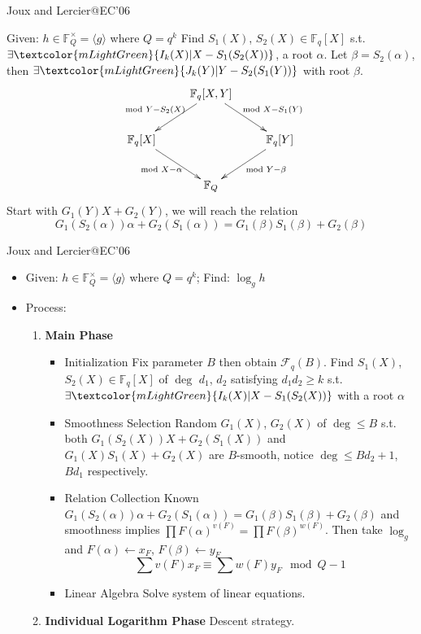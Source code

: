 \documentclass{beamer}
\begin{document}
		\begin{frame}{Joux and Lercier@EC'06}
			\begin{block}{Given: $h\in\mathbb{F}_Q^\times =\langle g\rangle$ where $Q = q^k$}
			Find $S_1(X)$, $S_2(X)\in\mathbb{F}_q[X]$ s.t. $\exists \textcolor{mLightGreen}{I_k(X)|X - S_1(S_2(X))}$, a root $\alpha$.
			Let $\beta = S_2(\alpha)$, then $\exists\textcolor{mLightGreen}{J_k(Y)|Y-S_2(S_1(Y))}$ with root $\beta$.
			\pause
			$$\xymatrix{
				& \mathbb{F}_q[X, Y] \ar[dl]_{\mod Y - S_2(X)} \ar[dr]^{\mod X - S_1(Y)} & \\
				\mathbb{F}_q[X] \ar[dr]_{\mod X - \alpha} & & \mathbb{F}_q[Y] \ar[dl]^{\mod Y - \beta} \\
				& \mathbb{F}_Q & 
			}$$
			\pause
			Start with $G_1(Y)X+G_2(Y)$, we will reach the relation
			$$G_1(S_2(\alpha))\alpha+G_2(S_1(\alpha)) = G_1(\beta)S_1(\beta)+G_2(\beta)$$
			\end{block}
		\end{frame}
		\begin{frame}{Joux and Lercier@EC'06}
			\begin{itemize}
				\item
					Given: $h\in\mathbb{F}_Q^\times = \langle g\rangle$ where $Q = q^k$; Find: $\log_g h$
				\item
					Process:
					\begin{enumerate}
						\item
							\textbf{Main Phase}
						\begin{itemize}
							\item
								\alert{Initialization} 
								Fix parameter $B$ then obtain $\mathcal{F}_q(B)$. 
								Find $S_1(X)$, $S_2(X)\in\mathbb{F}_q[X]$ of $\deg$ $d_1$, $d_2$ 
								satisfying $d_1d_2\geq k$ s.t. 
								$\exists \textcolor{mLightGreen}{I_k(X)|X - S_1(S_2(X))}$ 
								with a root $\alpha$
							\item
								\alert{Smoothness Selection} 
								Random $G_1(X)$, $G_2(X)$ of $\deg\leq B$ s.t. 
								both $G_1(S_2(X))X+G_2(S_1(X))$ and $G_1(X)S_1(X)+G_2(X)$ are $B$-smooth, 
								notice $\deg\leq B d_2 + 1$, $B d_1$ respectively.
							\item
								\alert{Relation Collection} Known
								$G_1(S_2(\alpha))\alpha+G_2(S_1(\alpha)) = G_1(\beta)S_1(\beta)+G_2(\beta)$
								and smoothness implies 
								$\prod F(\alpha)^{v(F)} = \prod F(\beta)^{w(F)}$.
								Then take $\log_g$ and $F(\alpha)\leftarrow x_F$, $F(\beta)\leftarrow y_F$
								$$\sum v(F) x_F \equiv \sum w(F) y_F \mod Q-1$$
							\item
								\alert{Linear Algebra} Solve system of linear equations.
						\end{itemize}
						\item
							\textbf{Individual Logarithm Phase} Descent strategy.
					\end{enumerate}
			\end{itemize}
		\end{frame}
\end{document}
